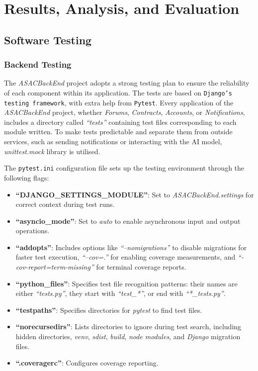 \chapter{Results, Analysis, and Evaluation}

\section{Software Testing}

\subsection{Backend Testing}

The \textit{ASACBackEnd} project adopts a strong testing plan to ensure the reliability of each component within its application. The tests are based on \texttt{Django's testing framework}, with extra help from \texttt{Pytest}. Every application of the \textit{ASACBackEnd} project, whether \textit{Forums}, \textit{Contracts}, \textit{Accounts}, or \textit{Notifications}, includes a directory called \textit{``tests''} containing test files corresponding to each module written. To make tests predictable and separate them from outside services, such as sending notifications or interacting with the AI model, \textit{unittest.mock} library is utilised.

The \texttt{pytest.ini} configuration file sets up the testing environment through the following flags:

\begin{itemize}
    \item \textbf{``DJANGO\_SETTINGS\_MODULE''}: Set to \textit{ASACBackEnd.settings} for correct context during test runs.
    \item \textbf{``asyncio\_mode''}: Set to \textit{auto} to enable asynchronous input and output operations.
    \item \textbf{``addopts''}: Includes options like \textit{``--nomigrations''} to disable migrations for faster test execution, \textit{``--cov=.''} for enabling coverage measurements, and \textit{``-cov-report=term-missing''} for terminal coverage reports.
    \item \textbf{``python\_files''}: Specifies test file recognition patterns: their names are either \textit{``tests.py''}, they start with \textit{``test\_*''}, or end with \textit{``*\_tests.py''}. 
    \item \textbf{``testpaths''}: Specifies directories for \textit{pytest} to find test files.
    \item \textbf{``norecursedirs''}: Lists directories to ignore during test search, including hidden directories, \textit{venv}, \textit{sdist}, \textit{build}, \textit{node modules}, and \textit{Django} migration files.
    \item \textbf{``.coveragerc''}: Configures coverage reporting.
\end{itemize}

